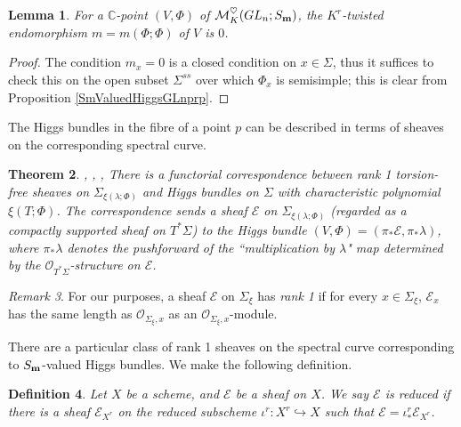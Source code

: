 \documentclass{amsart}
\newtheorem{theorem}{Theorem}
\newtheorem{lemma}[theorem]{Lemma}
\newtheorem{definition}[theorem]{Definition}
\theoremstyle{remark}
\newtheorem{remark}[theorem]{Remark}
\numberwithin{theorem}{section}
\numberwithin{equation}{section}
\begin{document}
\begin{lemma}\label{MinPolyHiggsFibrelem}
    For a $\mathbb{C}$-point $(V,\Phi)$ of $\mathcal M_K^\heartsuit(GL_n;S_{\bf m})$, the $K^r$-twisted endomorphism $m=m(\Phi;\Phi)$ of $V$ is $0$.
\end{lemma}

\begin{proof}
The condition $m_x=0$ is a closed condition on $x\in \Sigma$, thus it suffices to check this on the open subset $\Sigma^{ss}$ over which $\Phi_x$ is semisimple; this is clear from Proposition \ref{SmValuedHiggsGLnprp}.
\end{proof}

The Higgs bundles in the fibre of a point $p$ can be described in terms of sheaves on the corresponding spectral curve.

\begin{theorem}\label{SpectralDatathm}\cite{Hitchin2}, \cite{BNR}, \cite{Schaub}, \cite{deCataldo}
There is a functorial correspondence between rank 1 torsion-free sheaves on ${\Sigma}_{\xi(\lambda;\Phi)}$ and Higgs bundles on $\Sigma$ with characteristic polynomial $\xi(T;\Phi)$. The correspondence sends a sheaf $\mathcal E$ on ${\Sigma}_{\xi(\lambda;\Phi)}$ (regarded as a compactly supported sheaf on $T^*\Sigma$) to the Higgs bundle $(V,\Phi) = (\pi_*\mathcal E,\pi_*\lambda)$, where $\pi_*\lambda$ denotes the pushforward of the ``multiplication by $\lambda$" map determined by the $\mathcal O_{T^*\Sigma}$-structure on $\mathcal E$.
\end{theorem}

\begin{remark}\label{SpectralDatarmk}
    For our purposes, a sheaf $\mathcal E$ on ${\Sigma}_\xi$ has \emph{rank 1} if for every $x\in {\Sigma}_\xi$, $\mathcal E_x$ has the same length as $\mathcal O_{{\Sigma}_\xi,x}$ as an $\mathcal O_{{\Sigma}_\xi,x}$-module.
\end{remark}

There are a particular class of rank 1 sheaves on the spectral curve corresponding to $S_{\bf m}$-valued Higgs bundles. We make the following definition.

\begin{definition}\label{ReducedSheafdef}
    Let $X$ be a scheme, and $\mathcal E$ be a sheaf on $X$. We say $\mathcal E$ is \emph{reduced} if there is a sheaf $\mathcal E_{X^r}$ on the reduced subscheme $\iota^r:X^r \hookrightarrow X$ such that $\mathcal E = \iota^r_*\mathcal E_{X^r}$.
\end{definition}
\end{document}

